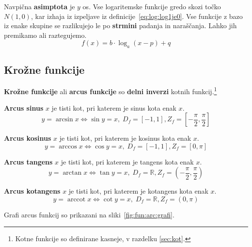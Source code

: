 \documentclass[a4paper,oneside,12pt,fleqn]{article}
\def\R{\ensuremath{\mathbb R}}
\newcommand\krat\cdot
\newcommand{\arccot}{\ensuremath{\operatorname{arccot}}} %
\def\kos{\cos}
\renewcommand\iff\Leftrightarrow
\numberwithin{equation}{section}
\begin{document}
Navpična \textbf{asimptota} je $y$ os. Vse logaritemske funkcije gredo skozi točko $N(1,0)$, kar
izhaja iz izpeljave iz definicije~\eqref{eq:log:log1je0}. Vse funkcije z bazo iz enake
skupine se razlikujejo le
po \textbf{strmini} padanja in naraščanja. Lahko jih premikamo ali raztegujemo.
\[ f(x) = b\krat\log_a\!(x-p) + q \]

\subsection{Krožne funkcije}
\label{sec:fun:arc}
\textbf{Krožne funkcije} ali \textbf{arcus funkcije} so \textbf{delni inverzi} kotnih funkcij.\footnote{Kotne funkcije
so definirane kasneje, v razdelku \ref{sec:kot}.}

\textbf{Arcus sinus} $x$ je tisti kot, pri katerem je sinus kota enak $x$.
\[ y = \arcsin x \iff \sin y = x, \; D_f = [-1,1], Z_f = \left[ -\frac{\pi}{2},
\frac{\pi}{2} \right] \]

\textbf{Arcus kosinus} $x$ je tisti kot, pri katerem je kosinus kota enak $x$.
\[ y = \arccos x \iff \kos y = x, \; D_f = [-1,1], Z_f = \left[0, \pi \right] \]

\textbf{Arcus tangens} $x$ je tisti kot, pri katerem je tangens kota enak $x$.
\[ y = \arctan x \iff \tan y = x, \; D_f = \R, Z_f = \left( -\frac{\pi}{2},
\frac{\pi}{2} \right) \]

\textbf{Arcus kotangens} $x$ je tisti kot, pri katerem je kotangens kota enak $x$.
\[ y = \arccot x \iff \cot y = x, \; D_f = \R, Z_f = \left(0, \pi \right) \]

Grafi arcus funkcij so prikazani na sliki~\ref{fig:fun:arc:grafi}.
\end{document}
